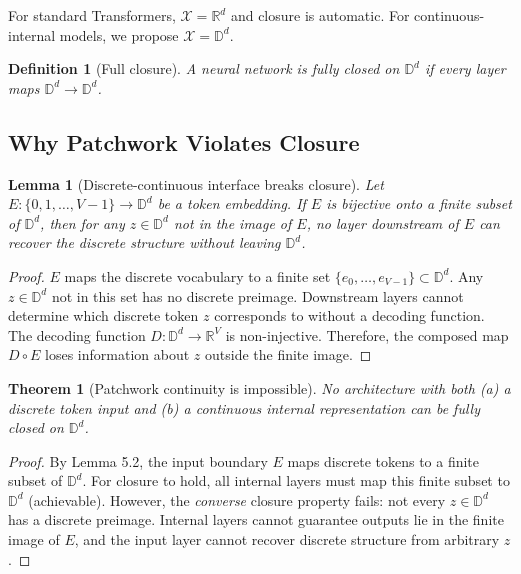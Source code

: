 \documentclass{article}
\newtheorem{theorem}{Theorem}
\newtheorem{lemma}{Lemma}
\newtheorem{definition}{Definition}
\begin{document}
For standard Transformers, $\mathcal{X} = \mathbb{R}^d$ and closure is automatic. For continuous-internal models, we propose $\mathcal{X} = \mathbb{D}^d$.

\begin{definition}[Full closure]
A neural network is \emph{fully closed} on $\mathbb{D}^d$ if every layer maps $\mathbb{D}^d \to \mathbb{D}^d$.
\end{definition}

\subsection{Why Patchwork Violates Closure}

\begin{lemma}[Discrete-continuous interface breaks closure]
Let $E: \{0, 1, \ldots, V-1\} \to \mathbb{D}^d$ be a token embedding. If $E$ is bijective onto a finite subset of $\mathbb{D}^d$, then for any $z \in \mathbb{D}^d$ not in the image of $E$, no layer downstream of $E$ can recover the discrete structure without leaving $\mathbb{D}^d$.
\end{lemma}

\begin{proof}
$E$ maps the discrete vocabulary to a finite set $\{e_0, \ldots, e_{V-1}\} \subset \mathbb{D}^d$. Any $z \in \mathbb{D}^d$ not in this set has no discrete preimage. Downstream layers cannot determine which discrete token $z$ corresponds to without a decoding function. The decoding function $D: \mathbb{D}^d \to \mathbb{R}^V$ is non-injective. Therefore, the composed map $D \circ E$ loses information about $z$ outside the finite image. \qedhere
\end{proof}

\begin{theorem}[Patchwork continuity is impossible]
No architecture with both (a) a discrete token input and (b) a continuous internal representation can be fully closed on $\mathbb{D}^d$.
\end{theorem}

\begin{proof}
By Lemma 5.2, the input boundary $E$ maps discrete tokens to a finite subset of $\mathbb{D}^d$. For closure to hold, all internal layers must map this finite subset to $\mathbb{D}^d$ (achievable). However, the \emph{converse} closure property fails: not every $z \in \mathbb{D}^d$ has a discrete preimage. Internal layers cannot guarantee outputs lie in the finite image of $E$, and the input layer cannot recover discrete structure from arbitrary $z$. \qedhere
\end{proof}
\end{document}
